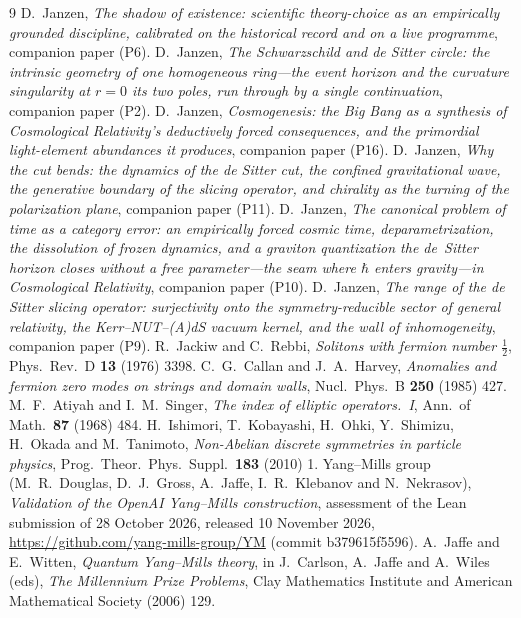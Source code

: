 \documentclass[11pt]{article}
\begin{document}
\begin{thebibliography}{9}
 D.~Janzen, \emph{The shadow of existence: scientific theory-choice as an empirically grounded discipline, calibrated on the historical record and on a live programme}, companion paper (P6).
 D.~Janzen, \emph{The Schwarzschild and de Sitter circle: the intrinsic geometry of one homogeneous ring---the event horizon and the curvature singularity at $r=0$ its two poles, run through by a single continuation}, companion paper (P2).
 D.~Janzen, \emph{Cosmogenesis: the Big Bang as a synthesis of Cosmological Relativity's deductively forced consequences, and the primordial light-element abundances it produces}, companion paper (P16).
 D.~Janzen, \emph{Why the cut bends: the dynamics of the de Sitter cut, the confined gravitational wave, the generative boundary of the slicing operator, and chirality as the turning of the polarization plane}, companion paper (P11).
 D.~Janzen, \emph{The canonical problem of time as a category error: an empirically forced cosmic time, deparametrization, the dissolution of frozen dynamics, and a graviton quantization the de~Sitter horizon closes without a free parameter---the seam where $\hbar$ enters gravity---in Cosmological Relativity}, companion paper (P10).
 D.~Janzen, \emph{The range of the de Sitter slicing operator: surjectivity onto the symmetry-reducible sector of general relativity, the Kerr--NUT--(A)dS vacuum kernel, and the wall of inhomogeneity}, companion paper (P9).
 R.~Jackiw and C.~Rebbi, \emph{Solitons with fermion number $\tfrac12$}, Phys.\ Rev.\ D \textbf{13} (1976) 3398.
 C.~G.~Callan and J.~A.~Harvey, \emph{Anomalies and fermion zero modes on strings and domain walls}, Nucl.\ Phys.\ B \textbf{250} (1985) 427.
 M.~F.~Atiyah and I.~M.~Singer, \emph{The index of elliptic operators.\ I}, Ann.\ of Math.\ \textbf{87} (1968) 484.
 H.~Ishimori, T.~Kobayashi, H.~Ohki, Y.~Shimizu, H.~Okada and M.~Tanimoto, \emph{Non-Abelian discrete symmetries in particle physics}, Prog.\ Theor.\ Phys.\ Suppl.\ \textbf{183} (2010) 1.
 Yang--Mills group (M.~R.~Douglas, D.~J.~Gross, A.~Jaffe, I.~R.~Klebanov and N.~Nekrasov), \emph{Validation of the OpenAI Yang--Mills construction}, assessment of the Lean submission of 28 October 2026, released 10 November 2026, \url{https://github.com/yang-mills-group/YM} (commit b379615f5596).
 A.~Jaffe and E.~Witten, \emph{Quantum Yang--Mills theory}, in J.~Carlson, A.~Jaffe and A.~Wiles (eds), \emph{The Millennium Prize Problems}, Clay Mathematics Institute and American Mathematical Society (2006) 129.

\end{thebibliography}
\end{document}
